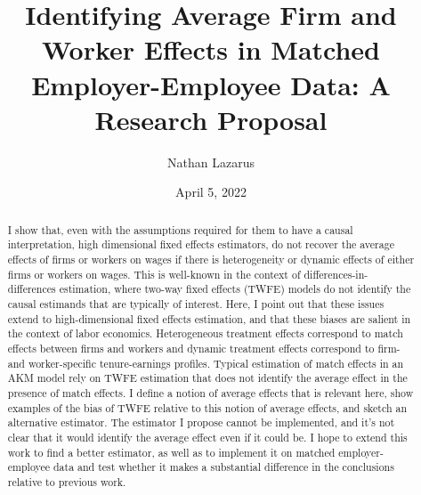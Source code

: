 \documentclass{article}
\title{Identifying Average Firm and Worker Effects in Matched Employer-Employee Data: A Research Proposal}
\author{Nathan Lazarus}
\date{April 5, 2022}
\begin{document}

\clearpage\maketitle
\thispagestyle{empty}

\begin{abstract}
    I show that, even with the assumptions required for them to have a causal interpretation, high dimensional fixed effects estimators, do not recover the average effects of firms or workers on wages if there is heterogeneity or dynamic effects of either firms or workers on wages. This is well-known in the context of differences-in-differences estimation, where two-way fixed effects (TWFE) models do not identify the causal estimands that are typically of interest. Here, I point out that these issues extend to high-dimensional fixed effects estimation, and that these biases are salient in the context of labor economics. Heterogeneous treatment effects correspond to match effects between firms and workers and dynamic treatment effects correspond to firm- and worker-specific tenure-earnings profiles. Typical estimation of match effects in an AKM model \citep{woodcock2015match} rely on TWFE estimation that does not identify the average effect in the presence of match effects. I define a notion of average effects that is relevant here, show examples of the bias of TWFE relative to this notion of average effects, and sketch an alternative estimator. The estimator I propose cannot be implemented, and it's not clear that it would identify the average effect even if it could be. I hope to extend this work to find a better estimator, as well as to implement it on matched employer-employee data and test whether it makes a substantial difference in the conclusions relative to previous work.
\end{abstract}



\end{document}
